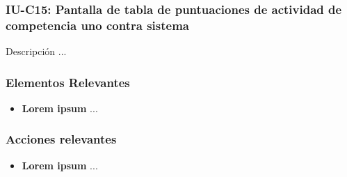 
\subsubsection{IU-C15: Pantalla de tabla de puntuaciones de actividad de competencia uno contra sistema}

 Descripción ...


\subsubsection{Elementos Relevantes}

    \begin{itemize}
    \item {\bf Lorem ipsum}
        ...
    \end{itemize}

\subsubsection{Acciones relevantes}

    \begin{itemize}
    \item {\bf Lorem ipsum}
        ...
    \end{itemize}

\clearpage
